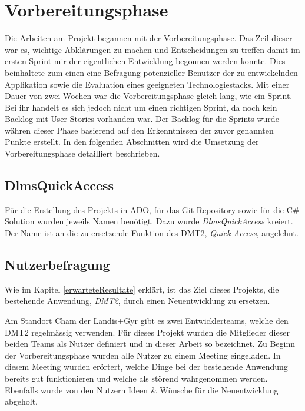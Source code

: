 \section{Vorbereitungsphase}
Die Arbeiten am Projekt begannen mit der Vorbereitungsphase. Das Zeil dieser war es, wichtige Abklärungen zu machen und Entscheidungen zu treffen damit im ersten Sprint mir der eigentlichen Entwicklung begonnen werden konnte.
Dies beinhaltete zum einen eine Befragung potenzieller Benutzer der zu entwickelnden Applikation sowie die Evaluation eines geeigneten Technologiestacks.
Mit einer Dauer von zwei Wochen war die Vorbereitungsphase gleich lang, wie ein Sprint. Bei ihr handelt es sich jedoch nicht um einen richtigen Sprint, da noch kein Backlog mit User Stories vorhanden war.
Der Backlog für die Sprints wurde währen dieser Phase basierend auf den Erkenntnissen der zuvor genannten Punkte erstellt.
In den folgenden Abschnitten wird die Umsetzung der Vorbereitungsphase detailliert beschrieben.

\subsection{DlmsQuickAccess}
Für die Erstellung des Projekts in \ac{ADO}, für das Git-Repository sowie für die C\# Solution wurden jeweils Namen benötigt.
Dazu wurde \textit{DlmsQuickAccess} kreiert.
Der Name ist an die zu ersetzende Funktion des \ac{DMT2}, \textit{Quick Access}, angelehnt.

\subsection{Nutzerbefragung}
Wie im Kapitel \ref{erwarteteResultate} erklärt, ist das Ziel dieses Projekts, die bestehende Anwendung, \textit{DMT2}, durch einen Neuentwicklung zu ersetzen.

Am Standort Cham der Landis+Gyr gibt es zwei Entwicklerteams, welche den DMT2 regelmässig verwenden.
Für dieses Projekt wurden die Mitglieder dieser beiden Teams als Nutzer definiert und in dieser Arbeit so bezeichnet.  %
Zu Beginn der Vorbereitungsphase wurden alle Nutzer zu einem Meeting eingeladen.
In diesem Meeting wurden erörtert, welche Dinge bei der bestehende Anwendung bereits gut funktionieren und welche als störend wahrgenommen werden.
Ebenfalls wurde von den Nutzern Ideen \& Wünsche für die Neuentwicklung abgeholt.

